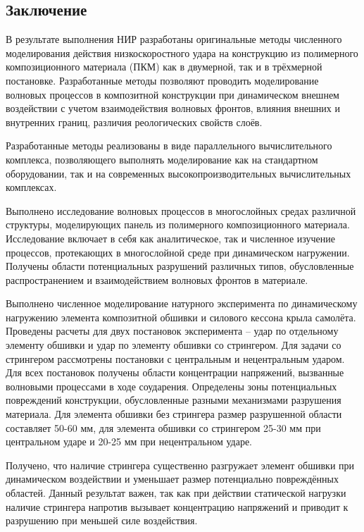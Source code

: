 \begin{center}\section*{Заключение}\end{center}

В результате выполнения НИР разработаны оригинальные методы численного моделирования действия низкоскоростного удара на конструкцию из полимерного композиционного материала (ПКМ) как в двумерной, так и в трёхмерной постановке. Разработанные методы позволяют проводить моделирование волновых процессов в композитной конструкции при динамическом внешнем воздействии с учетом взаимодействия волновых фронтов, влияния внешних и внутренних границ, различия реологических свойств слоёв.

Разработанные методы реализованы в виде параллельного вычислительного комплекса, позволяющего выполнять моделирование как на стандартном оборудовании, так и на современных высокопроизводительных вычислительных комплексах.

Выполнено исследование волновых процессов в многослойных средах различной структуры, моделирующих панель из полимерного композиционного материала. Исследование включает в себя как аналитическое, так и численное изучение процессов, протекающих в многослойной среде при динамическом нагружении. Получены области потенциальных разрушений различных типов, обусловленные распространением и взаимодействием волновых фронтов в материале.

Выполнено численное моделирование натурного эксперимента по динамическому нагружению элемента композитной обшивки и силового кессона крыла самолёта. Проведены расчеты для двух постановок эксперимента -- удар по отдельному элементу обшивки и удар по элементу обшивки со стрингером. Для задачи со стрингером рассмотрены постановки с центральным и нецентральным ударом. Для всех постановок получены области концентрации напряжений, вызванные волновыми процессами в ходе соударения. Определены зоны потенциальных повреждений конструкции, обусловленные разными механизмами разрушения материала. Для элемента обшивки без стрингера размер разрушенной области составляет 50-60 мм, для элемента обшивки со стрингером 25-30 мм при центральном ударе и 20-25 мм при нецентральном ударе.

Получено, что наличие стрингера существенно разгружает элемент обшивки при динамическом воздействии и уменьшает размер потенциально повреждённых областей. Данный результат важен, так как при действии статической нагрузки наличие стрингера напротив вызывает концентрацию напряжений и приводит к разрушению при меньшей силе воздействия.

